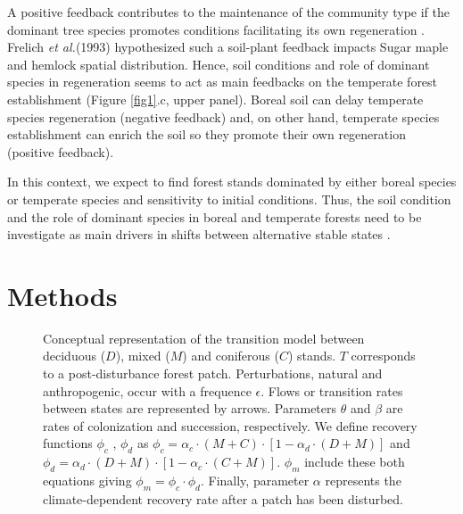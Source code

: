 
A positive feedback contributes to the maintenance of the community type if
the dominant tree species promotes conditions facilitating its own
regeneration \cite{Barras1998}. Frelich \textit{et al.}(1993)
\cite{Society2014} hypothesized such a soil-plant feedback impacts Sugar maple
and hemlock spatial distribution. Hence, soil conditions and role of dominant
species in regeneration seems to act as main feedbacks on the temperate forest
establishment (Figure \ref{fig1}.c, upper panel). Boreal soil can delay
temperate species regeneration (negative feedback) and, on other hand,
temperate species establishment can enrich the soil so they promote their own
regeneration (positive feedback).


In this context, we expect to find forest stands dominated by either boreal
species or temperate species and sensitivity to initial conditions. Thus, the
soil condition and the role of dominant species in boreal and temperate
forests need to be investigate as main drivers in shifts between alternative
stable states \cite{Kellman2004,Moore2008,DeFrenne2013,Barras1998}.





\section{Methods}   

\begin{figure}
	
	\caption{Conceptual representation of the transition model between deciduous ($D$),
	mixed ($M$) and coniferous ($C$) stands. $T$ corresponds to a post-disturbance forest patch. Perturbations, natural and anthropogenic, occur with a frequence $\epsilon$. 
	Flows or transition rates between states are represented by arrows.
	Parameters $\theta$ and $\beta$ are rates of colonization and succession,
	respectively. We define recovery functions $\phi_c$ , $\phi_d$ as $\phi_c
	= \alpha_c \cdot (M+C) \cdot [1- \alpha_d \cdot (D+M)]$ and $\phi_d =
	\alpha_d \cdot (D+M) \cdot [1- \alpha_c \cdot (C+M)]$. $\phi_m$ include these both equations giving $\phi_m = \phi_c \cdot \phi_d$. Finally, parameter $\alpha$ represents the climate-dependent recovery rate after a patch has been disturbed.}
	\label{Model}
	\vspace{-1em}
\end{figure}


